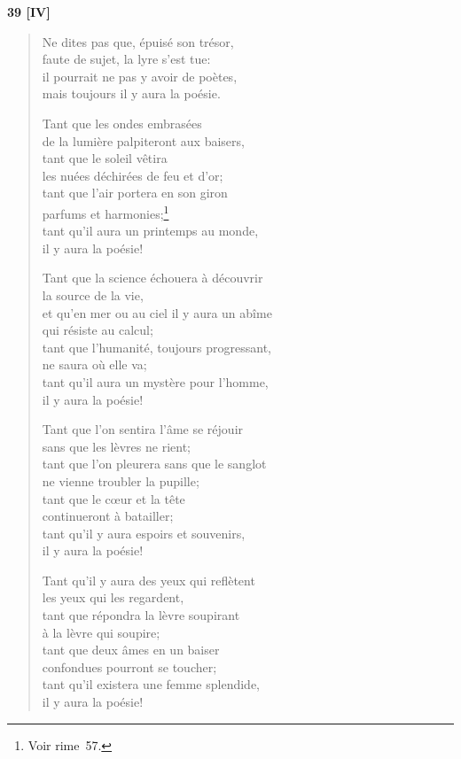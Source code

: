\bigskip\bigskip

\begin{center}
  \textbf{39 [IV]}
\end{center}

\begin{verse}
  Ne dites pas que, épuisé son trésor, \\
  faute de sujet, la lyre s'est tue: \\
  il pourrait ne pas y avoir de poètes, \\
  mais toujours il y aura la poésie.

  Tant que les ondes embrasées \\
  de la lumière palpiteront aux baisers, \\
  tant que le soleil vêtira \\
  les nuées déchirées de feu et d'or; \\
  tant que l'air portera en son giron \\
  parfums et harmonies;\footnote{Voir rime~57.} \\
  tant qu'il aura un printemps au monde, \\
  il y aura la poésie!

  Tant que la science échouera à découvrir \\
  la source de la vie, \\
  et qu'en mer ou au ciel il y aura un abîme \\
  qui résiste au calcul; \\
  tant que l'humanité, toujours progressant, \\
  ne saura où elle va; \\
  tant qu'il aura un mystère pour l'homme, \\
  il y aura la poésie!

  Tant que l'on sentira l'âme se réjouir \\
  sans que les lèvres ne rient; \\
  tant que l'on pleurera sans que le sanglot \\
  ne vienne troubler la pupille; \\
  tant que le cœur et la tête \\
  continueront à batailler; \\
  tant qu'il y aura espoirs et souvenirs, \\
  il y aura la poésie!

  Tant qu'il y aura des yeux qui reflètent \\
  les yeux qui les regardent, \\
  tant que répondra la lèvre soupirant \\
  à la lèvre qui soupire; \\
  tant que deux âmes en un baiser \\
  confondues pourront se toucher; \\
  tant qu'il existera une femme splendide, \\
  il y aura la poésie!
\end{verse}

